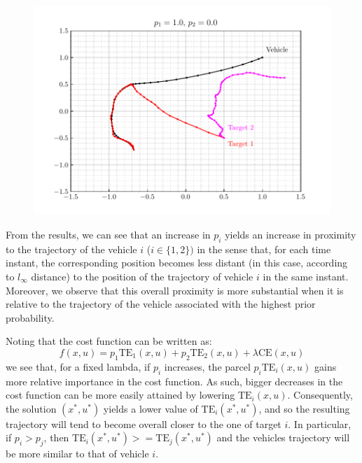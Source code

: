 \documentclass[12pt]{article}
\begin{document}
\begin{figure}[H]
    \centering
    \includegraphics{../../src/task_4/output/ex_4_i=6.pdf}
\end{figure}

From the results, we can see that an increase in $p_i$ yields an increase in proximity to the trajectory of the vehicle $i$ ($i \in \{1, 2\})$ in the sense that, for each time instant, the corresponding position becomes less distant (in this case, according to $l_{\infty}$ distance) to the position of the trajectory of vehicle $i$ in the same instant. Moreover, we observe that this overall proximity is more substantial when it is relative to the trajectory of the vehicle associated with the highest prior probability.

Noting that the cost function can be written as:
\[
    f(x, u) = p_1 \text{TE}_1(x, u) + p_2 \text{TE}_2(x, u) + \lambda \text{CE}(x, u)
\]
we see that, for a fixed lambda, if $p_i$ increases, the parcel $p_i \text{TE}_i(x, u)$ gains more relative importance in the cost function. As such, bigger decreases in the cost function can be more easily attained by lowering $\text{TE}_i(x, u)$. Consequently, the solution $(x^*, u^*)$ yields a lower value of $\text{TE}_i(x^*, u^*)$, and so the resulting trajectory will tend to become overall closer to the one of target $i$. In particular, if $p_i > p_j$, then  $\text{TE}_i(x^*, u^*) >=\text{TE}_j(x^*, u^*)$ and the vehicles trajectory will be more similar to that of vehicle $i$.
\end{document}
